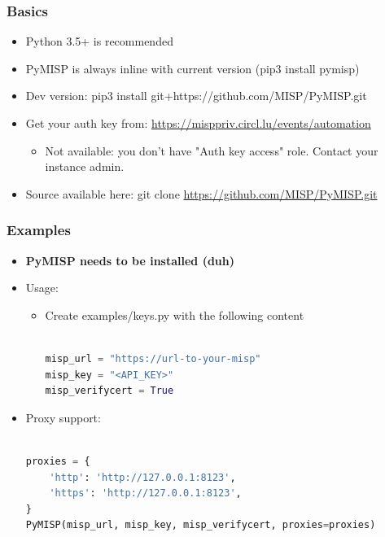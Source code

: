 \begin{frame}
	\frametitle{Basics}
	\begin{itemize}
		\item Python 3.5+ is recommended
		\item PyMISP is always inline with current version (pip3 install pymisp)
		\item Dev version: pip3 install git+https://github.com/MISP/PyMISP.git
		\item Get your auth key from: \url{https://misppriv.circl.lu/events/automation}
		\begin{itemize}
			\item Not available: you don't have "Auth key access" role. Contact your instance admin.
		\end{itemize}
		\item Source available here: git clone \url{https://github.com/MISP/PyMISP.git}
	\end{itemize}
\end{frame}

\begin{frame}[fragile]
	\frametitle{Examples}
	\begin{itemize}
		\item {\bf PyMISP needs to be installed (duh)}
		\item Usage:
		\begin{itemize}
			\item Create examples/keys.py with the following content
			\begin{adjustbox}{width=\textwidth,height=.9cm,keepaspectratio}
				\begin{lstlisting}[language=python,firstnumber=1]

misp_url = "https://url-to-your-misp"
misp_key = "<API_KEY>"
misp_verifycert = True

				\end{lstlisting}
			\end{adjustbox}
		\end{itemize}
		\item Proxy support:
		\begin{adjustbox}{width=\textwidth,height=.9cm,keepaspectratio}
			\begin{lstlisting}[language=python,firstnumber=1]

proxies = {
	'http': 'http://127.0.0.1:8123',
	'https': 'http://127.0.0.1:8123',
}
PyMISP(misp_url, misp_key, misp_verifycert, proxies=proxies)
			\end{lstlisting}
		\end{adjustbox}
	\end{itemize}
\end{frame}

